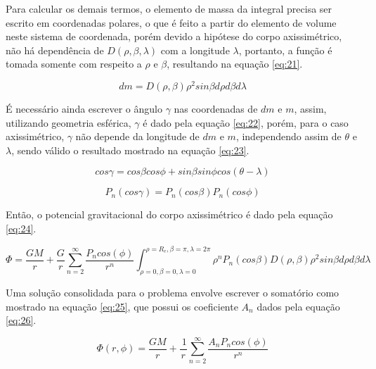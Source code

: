 Para calcular os demais termos, o elemento de massa da integral precisa ser escrito em coordenadas polares, o que é feito a partir do elemento de volume neste sistema de coordenada, porém devido a hipótese do corpo axissimétrico, não há dependência de $D(\rho , \beta , \lambda)$ com a longitude $\lambda$, portanto, a função é tomada somente com respeito a $\rho$ e $\beta$, resultando na equação \ref{eq:21}.

\begin{equation}
    dm = D(\rho , \beta ) \rho^{2} sin \beta d\rho d \beta d \lambda
    \label{eq:21}
\end{equation}

É necessário ainda escrever o ângulo $\gamma$ nas coordenadas de $dm$ e $m$, assim, utilizando geometria esférica, $\gamma$ é dado pela equação \ref{eq:22}, porém, para o caso axissimétrico, $\gamma$ não depende da longitude de $dm$ e $m$, independendo assim de $\theta$ e $\lambda$, sendo válido o resultado mostrado na equação \ref{eq:23}.

\begin{equation}
    cos \gamma = cos \beta cos \phi + sin \beta sin\phi cos (\theta - \lambda)
    \label{eq:22}
\end{equation}

\begin{equation}
    P_{n} (cos \gamma) = P_{n} (cos \beta) P_{n}(cos\phi)
    \label{eq:23}
\end{equation}

Então, o potencial gravitacional do corpo axissimétrico é dado pela equação \ref{eq:24}.

\begin{equation}
    \Phi = \frac{GM}{r} + \frac{G}{r} \sum\limits_{n=2}^{\mbox{$\infty$}} \frac{P_{n}cos(\phi) }{r^{n}} 
    \int_{\rho = 0, \beta = 0, \lambda = 0}^{\rho = R_{e}, \beta = \pi, \lambda = 2\pi}
    \rho^{n}P_{n}(cos \beta)D(\rho , \beta ) \rho^{2} sin \beta d\rho d \beta d \lambda
    \label{eq:24}
\end{equation}

Uma solução consolidada para o problema envolve escrever o somatório como mostrado na equação \ref{eq:25}, que possui os coeficiente $A_{n}$ dados pela equação \ref{eq:26}.

\begin{equation}
    \Phi(r,\phi) = \frac{GM}{r} + \frac{~1}{r}\sum\limits_{n=2}^{\mbox{$\infty$}} \frac{A_{n} P_{n}cos(\phi) }{r^{n}} 
    \label{eq:25}
\end{equation}

